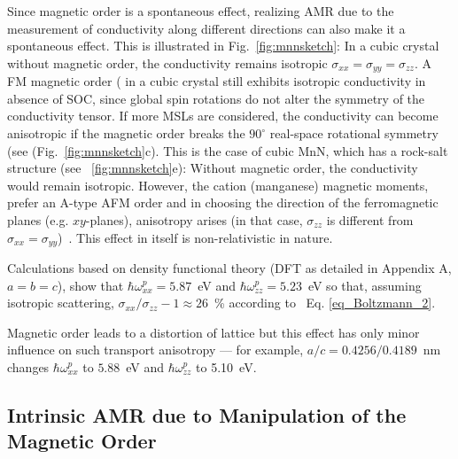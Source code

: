 \documentclass[prb,showpacs,amsmath,amssymb,superscriptaddress,twocolumn,floatfix]{revtex4-1}
\begin{document}
Since magnetic order is a spontaneous effect, realizing AMR due to the measurement of conductivity along different directions can also make it a spontaneous effect. This is illustrated in Fig.~\ref{fig:mnnsketch}: In a cubic crystal without magnetic order, the conductivity remains isotropic $\sigma_{xx}=\sigma_{yy}=\sigma_{zz}$. A FM magnetic order ( in a cubic crystal still exhibits isotropic conductivity in absence of SOC, since global spin rotations do not alter the symmetry of the conductivity tensor. If more MSLs are considered, the conductivity can become anisotropic if the magnetic order breaks the $90^\circ$ real-space rotational symmetry (see (Fig.~\ref{fig:mnnsketch}c). This is the case of cubic MnN, which has a rock-salt structure (see ~\ref{fig:mnnsketch}e): Without magnetic order, the conductivity would remain isotropic. However, the cation (manganese) magnetic moments, prefer an A-type AFM order and in choosing
the direction of the ferromagnetic planes (e.g. $xy$-planes),
anisotropy arises (in that case, $\sigma_{zz}$ is different from
$\sigma_{xx}=\sigma_{yy}$)~\cite{Granville:2005}. This effect in itself is non-relativistic in nature.

Calculations based on density functional theory (DFT as detailed in Appendix A, $a=b=c$), show that $\hbar\omega^p_{xx}=5.87$~eV and $\hbar\omega^p_{zz}=5.23$~eV so that, assuming isotropic scattering, $\sigma_{xx}/\sigma_{zz}-1\approx 26$~\% according to~ Eq. \ref{eq_Boltzmann_2}.

Magnetic order leads to a distortion of lattice but this effect has only minor influence on such transport anisotropy --- for example, $a/c=0.4256/0.4189$~nm changes $\hbar\omega^p_{xx}$ to $5.88$~eV and $\hbar\omega^p_{zz}$ to 5.10~eV.

\subsection{Intrinsic AMR due to Manipulation of the Magnetic Order}
\label{sec_I_Kagome}
\end{document}
